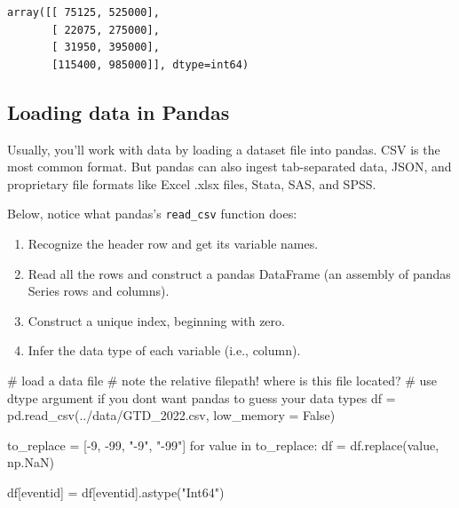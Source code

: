 \documentclass[
  letterpaper,
  DIV=11,
  numbers=noendperiod]{scrreprt}
\newenvironment{Shaded}{\begin{snugshade}}{\end{snugshade}}
\newcommand{\CommentTok}[1]{\textcolor[rgb]{0.37,0.37,0.37}{#1}}
\newcommand{\ControlFlowTok}[1]{\textcolor[rgb]{0.00,0.23,0.31}{#1}}
\newcommand{\DecValTok}[1]{\textcolor[rgb]{0.68,0.00,0.00}{#1}}
\newcommand{\KeywordTok}[1]{\textcolor[rgb]{0.00,0.23,0.31}{#1}}
\newcommand{\NormalTok}[1]{\textcolor[rgb]{0.00,0.23,0.31}{#1}}
\newcommand{\OperatorTok}[1]{\textcolor[rgb]{0.37,0.37,0.37}{#1}}
\newcommand{\StringTok}[1]{\textcolor[rgb]{0.13,0.47,0.30}{#1}}
\newcommand{\VariableTok}[1]{\textcolor[rgb]{0.07,0.07,0.07}{#1}}
\providecommand{\tightlist}{%
  \setlength{\itemsep}{0pt}\setlength{\parskip}{0pt}}\usepackage{longtable,booktabs,array}
\begin{document}
\begin{verbatim}
array([[ 75125, 525000],
       [ 22075, 275000],
       [ 31950, 395000],
       [115400, 985000]], dtype=int64)
\end{verbatim}

\subsection{Loading data in Pandas}\label{loading-data-in-pandas}

Usually, you'll work with data by loading a dataset file into pandas.
CSV is the most common format. But pandas can also ingest tab-separated
data, JSON, and proprietary file formats like Excel .xlsx files, Stata,
SAS, and SPSS.

Below, notice what pandas's \texttt{read\_csv} function does:

\begin{enumerate}
\def\labelenumi{\arabic{enumi}.}
\tightlist
\item
  Recognize the header row and get its variable names.
\item
  Read all the rows and construct a pandas DataFrame (an assembly of
  pandas Series rows and columns).
\item
  Construct a unique index, beginning with zero.
\item
  Infer the data type of each variable (i.e., column).
\end{enumerate}

\begin{Shaded}
\begin{Highlighting}[]
\CommentTok{\# load a data file}
\CommentTok{\# note the relative filepath! where is this file located?}
\CommentTok{\# use dtype argument if you don\textquotesingle{}t want pandas to guess your data types}
\NormalTok{df }\OperatorTok{=}\NormalTok{ pd.read\_csv(}\StringTok{\textquotesingle{}../data/GTD\_2022.csv\textquotesingle{}}\NormalTok{, low\_memory }\OperatorTok{=} \VariableTok{False}\NormalTok{)}
\end{Highlighting}
\end{Shaded}

\begin{Shaded}
\begin{Highlighting}[]
\NormalTok{to\_replace }\OperatorTok{=}\NormalTok{ [}\OperatorTok{{-}}\DecValTok{9}\NormalTok{, }\OperatorTok{{-}}\DecValTok{99}\NormalTok{, }\StringTok{"{-}9"}\NormalTok{, }\StringTok{"{-}99"}\NormalTok{]}
\ControlFlowTok{for}\NormalTok{ value }\KeywordTok{in}\NormalTok{ to\_replace:}
\NormalTok{    df }\OperatorTok{=}\NormalTok{ df.replace(value, np.NaN)}

\NormalTok{df[}\StringTok{\textquotesingle{}eventid\textquotesingle{}}\NormalTok{] }\OperatorTok{=}\NormalTok{ df[}\StringTok{\textquotesingle{}eventid\textquotesingle{}}\NormalTok{].astype(}\StringTok{"Int64"}\NormalTok{)}
\end{Highlighting}
\end{Shaded}
\end{document}

